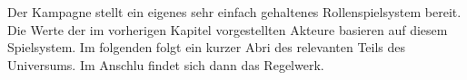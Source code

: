 
Der Kampagne stellt ein eigenes sehr einfach gehaltenes Rollenspielsystem bereit. Die Werte der im vorherigen Kapitel vorgestellten Akteure basieren auf diesem Spielsystem. Im folgenden folgt ein kurzer Abri\3 des relevanten Teils des Universums. Im Anschlu\3 findet sich dann das Regelwerk.



%